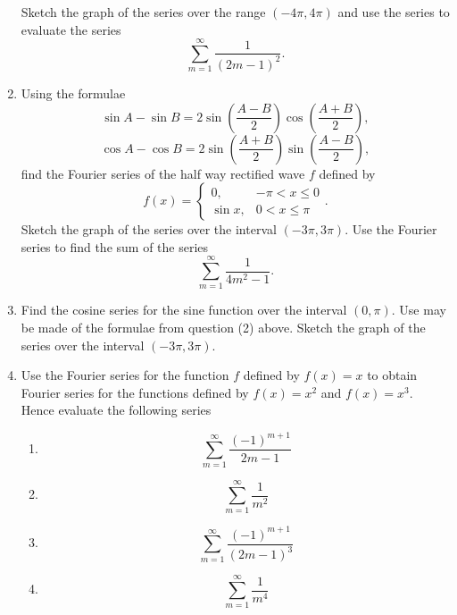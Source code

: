 \documentclass[a4paper]{amsart}
\begin{document}
\begin{enumerate}
Sketch the graph of the series over the range $(-4\pi,4\pi)$ and use the series to evaluate the series
$$\sum_{m=1}^\infty \frac{1}{(2m-1)^2}.$$
\item
Using the formulae
$$ \sin A - \sin B = 2 \sin \left ( \frac{A-B}{2} \right ) \cos \left ( \frac{A+B}{2} \right ) ,$$
$$  \cos A - \cos B = 2 \sin \left ( \frac{A+B}{2} \right ) \sin \left ( \frac{A-B}{2} \right ),$$
find the Fourier series of the half way rectified wave $f$ defined by 
$$ f(x) = \left \{ 
\begin{array}{rr}
0,& -\pi < x \leq 0 \\
\sin x , & 0 < x \leq \pi
\end{array} \right.
.$$
Sketch the graph of the series over the interval $(-3\pi,3\pi)$. Use the Fourier series to find the sum of the series 
$$ \sum_{m=1}^\infty \frac{1}{4m^2 -1} .$$
\item
Find the cosine series for the sine function over the interval $(0,\pi)$. Use may be made of the formulae from question (2) above. Sketch the graph of the series over the interval $(-3\pi,3\pi)$.
\item
Use the Fourier series for the function $f$ defined by $f(x)=x$ to obtain Fourier series for the functions defined by $f(x)=x^2$ and $f(x)=x^3$. Hence evaluate the following series
\begin{enumerate}
\item
$$ \sum_{m=1}^\infty \frac{(-1)^{m+1}}{2m-1} $$
\item
$$ \sum_{m=1}^\infty \frac{1}{m^2} $$
\item
$$ \sum_{m=1}^\infty \frac{(-1)^{m+1}}{\left ( 2m-1 \right )^3} $$
\item
$$ \sum_{m=1}^\infty \frac{1}{m^4} $$
\end{enumerate}
\end{enumerate}
\end{document}
